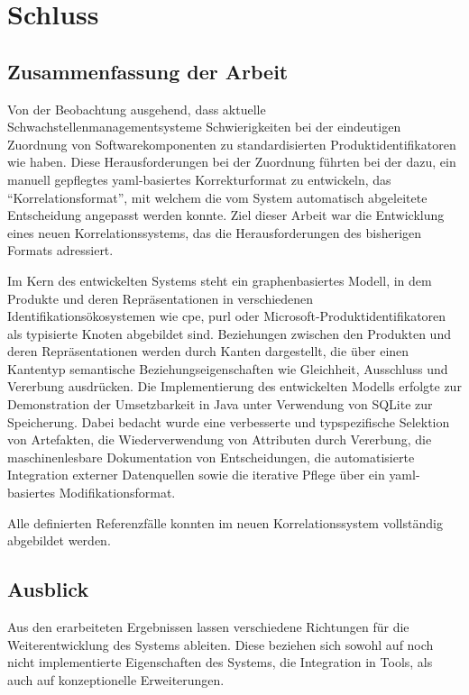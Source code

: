 \chapter{Schluss}\label{ch:abschluss}

\section{Zusammenfassung der Arbeit}\label{sec:schluss-zusammenfassung}

Von der Beobachtung ausgehend, dass aktuelle Schwachstellenmanagementsysteme Schwierigkeiten bei der eindeutigen Zuordnung von Softwarekomponenten zu standardisierten Produktidentifikatoren wie  haben.
Diese Herausforderungen bei der Zuordnung führten bei der \metaeffektsp dazu, ein manuell gepflegtes \acrshort{yaml}-basiertes Korrekturformat zu entwickeln, das \enquote{Korrelationsformat}, mit welchem die vom System automatisch abgeleitete Entscheidung angepasst werden konnte.
Ziel dieser Arbeit war die Entwicklung eines neuen Korrelationssystems, das die Herausforderungen des bisherigen Formats adressiert.

Im Kern des entwickelten Systems steht ein graphenbasiertes Modell, in dem Produkte und deren Repräsentationen in verschiedenen Identifikationsökosystemen wie \acrshort{cpe}, \acrshort{purl} oder Microsoft-Produktidentifikatoren als typisierte Knoten abgebildet sind.
Beziehungen zwischen den Produkten und deren Repräsentationen werden durch Kanten dargestellt, die über einen Kantentyp semantische Beziehungseigenschaften wie Gleichheit, Ausschluss und Vererbung ausdrücken.
Die Implementierung des entwickelten Modells erfolgte zur Demonstration der Umsetzbarkeit in Java unter Verwendung von SQLite zur Speicherung.
Dabei bedacht wurde eine verbesserte und typspezifische Selektion von Artefakten, die Wiederverwendung von Attributen durch Vererbung, die maschinenlesbare Dokumentation von Entscheidungen, die automatisierte Integration externer Datenquellen sowie die iterative Pflege über ein \acrshort{yaml}-basiertes Modifikationsformat.

Alle definierten Referenzfälle konnten im neuen Korrelationssystem vollständig abgebildet werden.

\section{Ausblick}\label{sec:schluss-ausblick}

Aus den erarbeiteten Ergebnissen lassen verschiedene Richtungen für die Weiterentwicklung des Systems ableiten.
Diese beziehen sich sowohl auf noch nicht implementierte Eigenschaften des Systems, die Integration in Tools, als auch auf konzeptionelle Erweiterungen.

